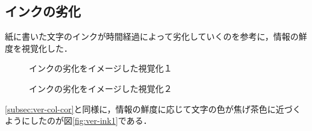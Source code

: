 \subsection{インクの劣化}
\label{subsec:ver-col-ink}

紙に書いた文字のインクが時間経過によって劣化していくのを参考に，情報の鮮度を視覚化した．

\begin{figure}[htbp]
  \begin{minipage}{0.5\hsize}
    \begin{center}
    \end{center}
    \caption{インクの劣化をイメージした視覚化１}
    \label{fig:ver-ink1}
  \end{minipage}
  \begin{minipage}{0.5\hsize}
    \begin{center}
    \end{center}
    \caption{インクの劣化をイメージした視覚化２}
    \label{fig:ver-ink2}
  \end{minipage}
\end{figure}

\ref{subsec:ver-col-cor}と同様に，情報の鮮度に応じて文字の色が焦げ茶色に近づくようにしたのが図\ref{fig:ver-ink1}である．

